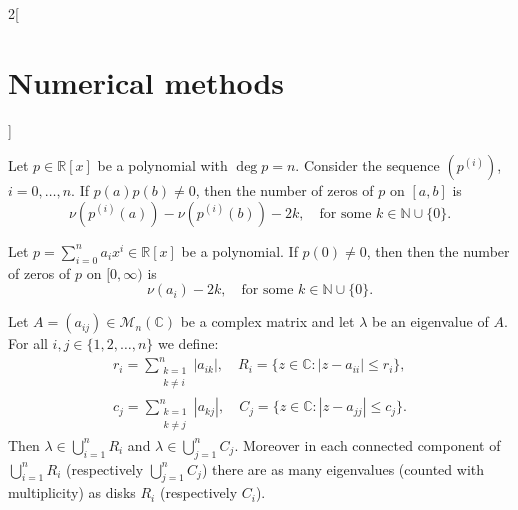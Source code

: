 \documentclass[class=article,10pt,crop=false]{standalone}
\begin{document}
\begin{multicols}{2}[\section{Numerical methods}]
\begin{prop}
\end{prop}
\begin{theorem}
Let $p\in\mathbb{R}[x]$ be a polynomial with $\deg p=n$. Consider the sequence $(p^{(i)})$, $i=0,\ldots,n$. If $p(a)p(b)\ne 0$, then the number of zeros of $p$ on $[a,b]$ is $$\nu\left(p^{(i)}(a)\right)-\nu\left(p^{(i)}(b)\right)-2k,\quad\text{for some }k\in\mathbb{N}\cup\{0\}.$$
\end{theorem}
\begin{corollary}
Let $\displaystyle p=\sum_{i=0}^na_ix^i\in\mathbb{R}[x]$ be a polynomial. If $p(0)\ne 0$, then then the number of zeros of $p$ on $[0,\infty)$ is $$\nu(a_i)-2k,\quad\text{for some }k\in\mathbb{N}\cup\{0\}.$$
\end{corollary}
\begin{theorem}
Let $A=(a_{ij})\in\mathcal{M}_n(\mathbb{C})$ be a complex matrix and let $\lambda$ be an eigenvalue of $A$. For all $i,j\in\{1,2,\ldots,n\}$ we define:
\begin{gather*}
    r_i=\sum_{\substack{k=1\\k\ne i}}^n|a_{ik}|,\quad R_i=\{z\in\mathbb{C}:|z-a_{ii}|\leq r_i\},\\
    c_j=\sum_{\substack{k=1\\k\ne j}}^n|a_{kj}|,\quad C_j=\{z\in\mathbb{C}:|z-a_{jj}|\leq c_j\}.
\end{gather*}
Then $\lambda\in\bigcup_{i=1}^nR_i$ and $\lambda\in\bigcup_{j=1}^nC_j$. Moreover in each connected component of $\bigcup_{i=1}^nR_i$ (respectively $\bigcup_{j=1}^nC_j$) there are as many eigenvalues (counted with multiplicity) as disks $R_i$ (respectively $C_i$). 
\end{theorem}
\end{multicols}
\end{document}
